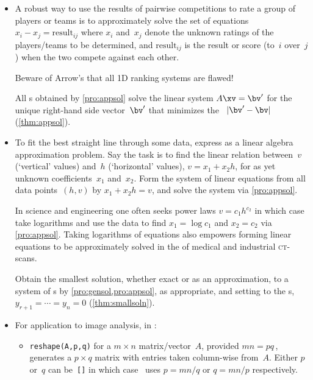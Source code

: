\begin{itemize}
\item A robust way to use the results of pairwise competitions to rate a group of players or teams is to approximately solve the set of equations \(x_i-x_j=\text{result}_{ij}\) where \(x_i\) and~\(x_j\) denote the unknown ratings of the players\slash teams to be determined, and \(\text{result}_{ij}\) is the result or score (to~\(i\) over~\(j\)) when the two compete against each other.

Beware of Arrow's  that all 1D ranking systems are flawed!

\itemme All s obtained by \cref{pro:appsol} solve the linear system \(A\xv=\bv'\) for the unique  right-hand side vector~\(\bv'\) that minimizes the ~\(|\bv'-\bv|\) (\cref{thm:appsol}).

\item To fit the best straight line through some data, express as a linear algebra approximation problem.
Say the task is to find the linear relation between~\(v\) (`vertical' values) and~\(h\) (`horizontal' values), \(v=x_1+x_2h\), for as yet unknown coefficients~\(x_1\) and~\(x_2\).
Form the system of linear equations from all data points~\((h,v)\) by \(x_1+x_2h=v\), and solve the system via \cref{pro:appsol}.

In science and engineering one often seeks power laws \(v=c_1h^{c_2}\) in which case take logarithms and use the data to find \(x_1=\log c_1\) and \(x_2=c_2\) via \cref{pro:appsol}.
Taking logarithms of equations also empowers forming linear equations to be approximately solved in the  of medical and industrial \textsc{ct}-scans.


\itemhi Obtain the {smallest solution}, whether exact or as an approximation, to a system of s by \cref{pro:gensol,pro:appsol}, as appropriate, and setting to  the s, \(y_{r+1}=\cdots=y_n=0\) (\cref{thm:smallsoln}).

\item For application to image analysis, in \script:
\begin{itemize}

\item {}\verb|reshape(A,p,q)| for a \(m\times n\) matrix\slash vector~\(A\), provided \(mn=pq\)\,, generates a \(p\times q\) matrix with entries taken column-wise from~\(A\).  
Either \(p\) or~\(q\) can be~\verb|[]| in which case \script\ uses \(p=mn/q\) or \(q=mn/p\) respectively.


\end{itemize}
\end{itemize}
